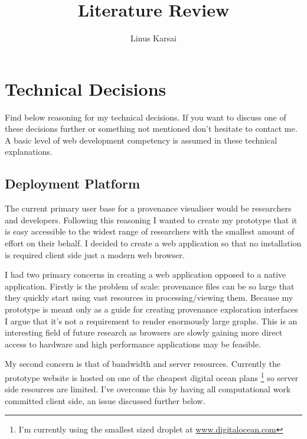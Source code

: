\documentclass[BIT, graphvis, a4paper]{usydthesis}
\title{Literature Review}
\begin{document}
\author{Linus Karsai}

\maketitle
\tableofcontents
\newpage\setcounter{page}{1}

\chapter{Technical Decisions}

Find below reasoning for my technical decisions. If you want to discuss one of these decisions further or something not mentioned don't hesitate to contact me. A basic level of web development competency is assumed in these technical explanations.

\section{Deployment Platform}
\label{sec:platform}

The current primary user base for a provenance visualiser would be researchers and developers. Following this reasoning I wanted to create my prototype that it is easy accessible to the widest range of researchers with the smallest amount of effort on their behalf. I decided to create a web application so that no installation is required client side just a modern web browser. 

I had two primary concerns in creating a web application opposed to a native application. Firstly is the problem of scale: provenance files can be so large that they quickly start using vast resources in processing/viewing them. Because my prototype is meant only as a guide for creating provenance exploration interfaces I argue that it's not a requirement to render enormously large graphs. This is an interesting field of future research as browsers are slowly gaining more direct access to hardware and high performance applications may be feasible. 

My second concern is that of bandwidth and server resources. Currently the prototype website is hosted on one of the cheapest digital ocean plans \footnote{I'm currently using the smallest sized droplet at \url{www.digitalocean.com}} so server side resources are limited. I've overcome this by having all computational work committed client side, an issue discussed further below.
\end{document}
